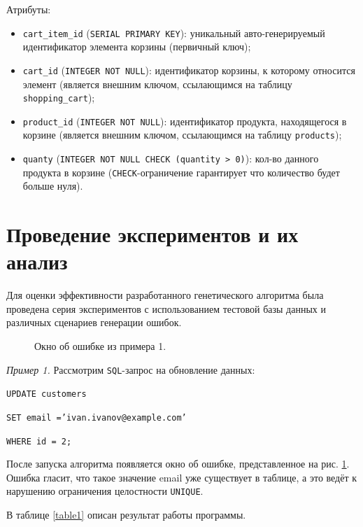 \documentclass[master,paper]{pmk-graduate}
\begin{document}
\begin{enumerate}
Атрибуты:
\begin{itemize}
	\item \texttt{cart\_item\_id} (\texttt{SERIAL PRIMARY KEY}): уникальный авто-генерируе\-мый идентификатор элемента корзины (первичный ключ);
	\item \texttt{cart\_id} (\texttt{INTEGER NOT NULL}): идентификатор корзины, к которому относится элемент (является внешним ключом, ссылающимся на таблицу \texttt{shopping\_cart});
	\item \texttt{product\_id} (\texttt{INTEGER NOT NULL}): идентификатор продукта, находящегося в корзине (является внешним ключом, ссылающимся на таблицу \texttt{products});
	\item \texttt{quanty} (\texttt{INTEGER NOT NULL CHECK (quantity > 0)}): кол-во данного продукта в корзине (\texttt{CHECK}-ограничение гарантирует что количество будет больше нуля).
\end{itemize}
\end{enumerate}

\section{Проведение экспериментов и их анализ}
\label{sec32}

Для оценки эффективности разработанного генетического алгоритма была проведена серия экспериментов с использованием тестовой базы данных и различных сценариев генерации ошибок.

\begin{figure}
	\centering
	\caption{Окно об ошибке из примера 1.}
	\label{fig3}
\end{figure}

\textit{Пример 1.} Рассмотрим \texttt{SQL}-запрос на обновление данных:

\texttt{UPDATE customers} 

\texttt{SET email =’ivan.ivanov@example.com’}

\texttt{WHERE id = 2;}

После запуска алгоритма появляется окно об ошибке, представленное на рис. \ref{fig3}. Ошибка гласит, что такое значение email уже существует в таблице, а это ведёт к нарушению ограничения целостности \texttt{UNIQUE}. 

В таблице \ref{table1} описан результат работы программы.
\end{document}
